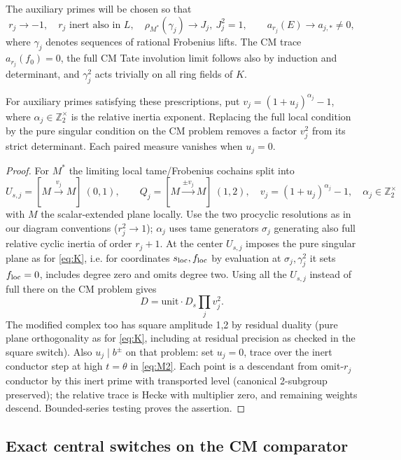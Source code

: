 The auxiliary primes will be chosen so that
\[
 r_j\to -1,\quad r_j\text{ inert also in }L,\quad
 \rho_{M^*}(\gamma_j)\to J_j,\ J_j^2=1,\qquad
 a_{r_j}(E)\to a_{j,*}\ne0,
\]
where \(\gamma_j\) denotes sequences of rational Frobenius lifts. The CM trace \(a_{r_j}(f_0)=0\), the full CM Tate involution limit follows also by induction and determinant, and \(\gamma_j^2\) acts trivially on all ring fields of \(K\).

\begin{lemma}\label{alternation-imaginary:local-factors}
For auxiliary primes satisfying these prescriptions, put \(v_j=(1+u_j)^{\alpha_j}-1\), where \(\alpha_j\in\mathbb Z_2^\times\) is the relative inertia exponent. Replacing the full local condition by the pure singular condition on the CM problem removes a factor \(v_j^2\) from its strict determinant. Each paired measure vanishes when \(u_j=0\).
\end{lemma}
\begin{proof}
For \(M^*\) the limiting local tame/Frobenius cochains split into
\[
 U_{s,j}=[M\xrightarrow{v_j}M]\ (0,1),\qquad Q_j=[M\xrightarrow{\pm v_j} M]\ (1,2),
 \quad v_j=(1+u_j)^{\alpha_j}-1,\quad \alpha_j\in\mathbb Z_2^\times
\]
with \(M\) the scalar-extended plane locally. Use the two procyclic resolutions as in our diagram conventions (\(r_j^2\to1\)); \(\alpha_j\) uses tame generators \(\sigma_j\) generating also full relative cyclic inertia of order \(r_j+1\). At the center \(U_{s,j}\) imposes the pure singular plane as for \eqref{eq:K}, i.e. for coordinates \(s_{\rm loc},f_{\rm loc}\) by evaluation at \(\sigma_j,\gamma_j^2\) it sets \(f_{\rm loc}=0\), includes degree zero and omits degree two. Using all the \(U_{s,j}\) instead of full there on the CM problem gives
\[
                          D=\mathrm{unit}\cdot D_s\prod_j v_j^2 .        \tag{I1}\label{eq:I1}
\]
The modified complex too has square amplitude 1,2 by residual duality (pure plane orthogonality as for \eqref{eq:K}, including at residual precision as checked in the square switch). Also \(u_j\mid b^\pm\) on that problem: set \(u_j=0\), trace over the inert conductor step at high \(t=\theta\) in \eqref{eq:M2}. Each point is a descendant from omit-\(r_j\) conductor by this inert prime with transported level (canonical 2-subgroup preserved); the relative trace is Hecke with multiplier zero, and remaining weights descend. Bounded-series testing proves the assertion.
\end{proof}

\subsection{Exact central switches on the CM comparator}

